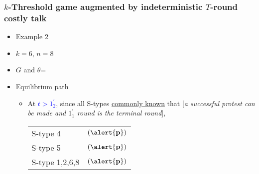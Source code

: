 \documentclass[9pt,handout]{beamer}
\begin{document}
\begin{frame}
  \frametitle{$k$-Threshold game augmented by indeterministic $T$-round costly talk}

\begin{itemize}
\item Example 2
\item $k=6$, $n=8$
\item $G$ and $\theta$=
\begin{center}
\end{center}
\end{itemize}

\begin{itemize}
\item Equilibrium path
\begin{itemize}
\item 
{
At \textcolor{blue}{$t>1^{'}_2$}, since all S-types \underline{commonly known} that \alert{[}\textit{a successful protest can be made and $1^{'}_1$ round is the terminal round}\alert{]},  
\begin{table}[h]
\begin{tabular}{ll }
S-type 4 & $(\alert{\textbf{p}})$\\
S-type 5 & $(\alert{\textbf{p}})$\\
S-type 1,2,6,8 & $(\alert{\textbf{p}})$
\end{tabular}
\end{table}
}

\end{itemize}
\end{itemize}
\end{frame}
\end{document}
